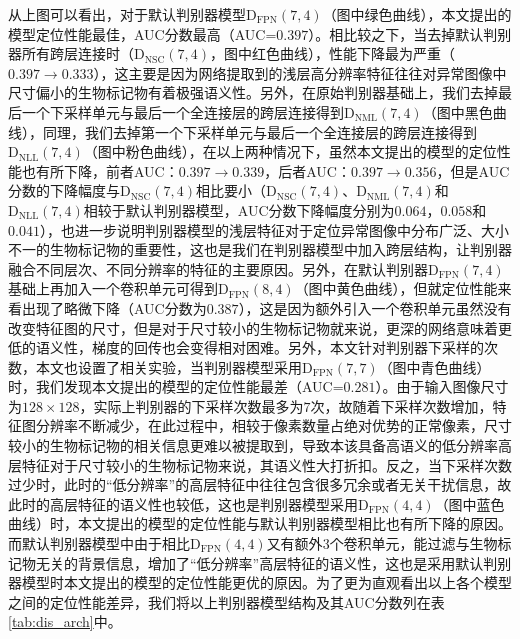 从上图可以看出，对于默认判别器模型$\mathrm{D}_\mathrm{FPN}(7,4)$（图中绿色曲线），本文提出的模型定位性能最佳，AUC分数最高（AUC=$0.397$）。相比较之下，当去掉默认判别器所有跨层连接时（$\mathrm{D}_\mathrm{NSC}(7,4)$，图中红色曲线），性能下降最为严重（$0.397\rightarrow 0.333$），这主要是因为网络提取到的浅层高分辨率特征往往对异常图像中尺寸偏小的生物标记物有着极强语义性。另外，在原始判别器基础上，我们去掉最后一个下采样单元与最后一个全连接层的跨层连接得到$\mathrm{D}_\mathrm{NML}(7,4)$（图中黑色曲线），同理，我们去掉第一个下采样单元与最后一个全连接层的跨层连接得到$\mathrm{D}_\mathrm{NLL}(7,4)$（图中粉色曲线），在以上两种情况下，虽然本文提出的模型的定位性能也有所下降，前者AUC：$0.397\rightarrow 0.339$，后者AUC：$0.397\rightarrow 0.356$，但是AUC分数的下降幅度与$\mathrm{D}_\mathrm{NSC}(7,4)$相比要小（$\mathrm{D}_\mathrm{NSC}(7,4)$、$\mathrm{D}_\mathrm{NML}(7,4)$和$\mathrm{D}_\mathrm{NLL}(7,4)$相较于默认判别器模型，AUC分数下降幅度分别为$0.064$，$0.058$和$0.041$），也进一步说明判别器模型的浅层特征对于定位异常图像中分布广泛、大小不一的生物标记物的重要性，这也是我们在判别器模型中加入跨层结构，让判别器融合不同层次、不同分辨率的特征的主要原因。另外，在默认判别器$\mathrm{D}_\mathrm{FPN}(7,4)$基础上再加入一个卷积单元可得到$\mathrm{D}_\mathrm{FPN}(8,4)$（图中黄色曲线），但就定位性能来看出现了略微下降（AUC分数为$0.387$），这是因为额外引入一个卷积单元虽然没有改变特征图的尺寸，但是对于尺寸较小的生物标记物就来说，更深的网络意味着更低的语义性，梯度的回传也会变得相对困难。另外，本文针对判别器下采样的次数，本文也设置了相关实验，当判别器模型采用$\mathrm{D}_\mathrm{FPN}(7,7)$（图中青色曲线）时，我们发现本文提出的模型的定位性能最差（AUC=$0.281$）。由于输入图像尺寸为$128\times 128$，实际上判别器的下采样次数最多为$7$次，故随着下采样次数增加，特征图分辨率不断减少，在此过程中，相较于像素数量占绝对优势的正常像素，尺寸较小的生物标记物的相关信息更难以被提取到，导致本该具备高语义的低分辨率高层特征对于尺寸较小的生物标记物来说，其语义性大打折扣。反之，当下采样次数过少时，此时的“低分辨率”的高层特征中往往包含很多冗余或者无关干扰信息，故此时的高层特征的语义性也较低，这也是判别器模型采用$\mathrm{D}_\mathrm{FPN}(4,4)$（图中蓝色曲线）时，本文提出的模型的定位性能与默认判别器模型相比也有所下降的原因。而默认判别器模型中由于相比$\mathrm{D}_\mathrm{FPN}(4,4)$又有额外$3$个卷积单元，能过滤与生物标记物无关的背景信息，增加了“低分辨率”高层特征的语义性，这也是采用默认判别器模型时本文提出的模型的定位性能更优的原因。为了更为直观看出以上各个模型之间的定位性能差异，我们将以上判别器模型结构及其AUC分数列在表\ref{tab:dis_arch}中。

